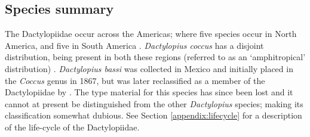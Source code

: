 \subsection{Species summary}
\label{ch01:species_summary}

The Dactylopiidae occur across the Americas; where five species occur in North America, and five in South America \citep{Rodriguez2001}. \textit{Dactylopius coccus} has a disjoint distribution, being present in both these regions (referred to as an `amphitropical' distribution) \citep{Rodriguez2001, VanDam2015}. \textit{Dactylopius bassi} was collected in Mexico and initially placed in the \textit{Coccus} genus in 1867, but was later reclassified as a member of the Dactylopiidae by \citet{ben2001taxonomy}. The type material for this species has since been lost and it cannot at present be distinguished from the other \textit{Dactylopius} species; making its classification somewhat dubious. See Section \ref{appendix:lifecycle} for a description of the life-cycle of the Dactylopiidae. \\

